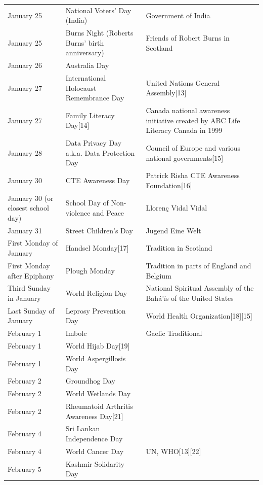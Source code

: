 \documentclass[
  openany]{book}
\begin{document}
\begin{longtable}[t]{>{\raggedright\arraybackslash}p{8em}>{\raggedright\arraybackslash}p{20em}>{\raggedright\arraybackslash}p{12em}}
January 25 & National Voters' Day (India) & Government of India\\
\addlinespace
\rowcolor{gray!6}  January 25 & Burns Night (Roberts Burns' birth anniversary) & Friends of Robert Burns in Scotland\\
January 26 & Australia Day & \\
\rowcolor{gray!6}  January 27 & International Holocaust Remembrance Day & United Nations General Assembly[13]\\
January 27 & Family Literacy Day[14] & Canada national awareness initiative created by ABC Life Literacy Canada in 1999\\
\rowcolor{gray!6}  January 28 & Data Privacy Day a.k.a. Data Protection Day & Council of Europe and various national governments[15]\\
\addlinespace
January 30 & CTE Awareness Day & Patrick Risha CTE Awareness Foundation[16]\\
\rowcolor{gray!6}  January 30 (or closest school day) & School Day of Non-violence and Peace & Llorenç Vidal Vidal\\
January 31 & Street Children's Day & Jugend Eine Welt\\
\rowcolor{gray!6}  First Monday of January & Handsel Monday[17] & Tradition in Scotland\\
First Monday after Epiphany & Plough Monday & Tradition in parts of England and Belgium\\
\addlinespace
\rowcolor{gray!6}  Third Sunday in January & World Religion Day & National Spiritual Assembly of the Bahá'ís of the United States\\
Last Sunday of January & Leprosy Prevention Day & World Health Organization[18][15]\\
\rowcolor{gray!6}  February 1 & Imbolc & Gaelic Traditional\\
February 1 & World Hijab Day[19] & \\
\rowcolor{gray!6}  February 1 & World Aspergillosis Day & [20]\\
\addlinespace
February 2 & Groundhog Day & \\
\rowcolor{gray!6}  February 2 & World Wetlands Day & \\
February 2 & Rheumatoid Arthritis Awareness Day[21] & \\
\rowcolor{gray!6}  February 4 & Sri Lankan Independence Day & \\
February 4 & World Cancer Day & UN, WHO[13][22]\\
\addlinespace
\rowcolor{gray!6}  February 5 & Kashmir Solidarity Day & \\

\end{longtable}
\end{document}
